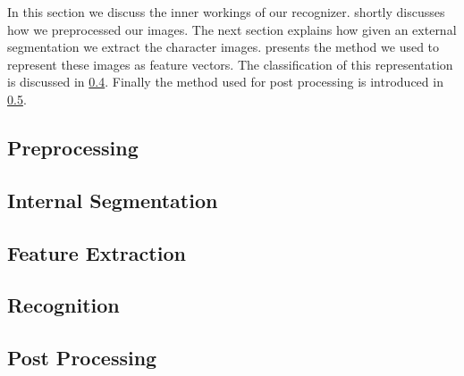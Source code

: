 In this section we discuss the inner workings of our recognizer.  shortly discusses how we preprocessed our images. The next section explains how given an external segmentation we extract the character images.  presents the method we used to represent these images as feature vectors. The classification of this representation is discussed in \cref{ss:methods:machineLearing}. Finally the method used for post processing is introduced in \cref{ss:methods:postprocessing}.

\subsection{Preprocessing}
\label{ss:methods:preprocessing}


\subsection{Internal Segmentation}
\label{ss:methods:characterSegmentation}


\subsection{Feature Extraction}
\label{ss:methods:featureExtraction}


\subsection{Recognition}
\label{ss:methods:machineLearing}


\subsection{Post Processing}
\label{ss:methods:postprocessing}
